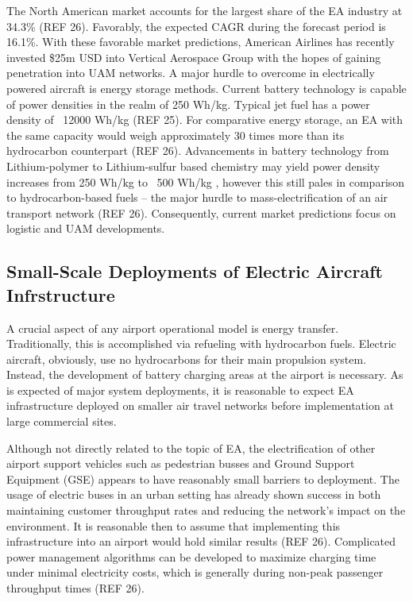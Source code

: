 \documentclass{article}
\begin{document}
The North American market accounts for the largest share of the EA industry at 34.3\% (REF 26). 
Favorably, the expected CAGR during the forecast period is 16.1\%. 
With these favorable market predictions, American Airlines has recently invested \$25m USD into Vertical Aerospace Group with the hopes of gaining penetration into UAM networks.  
A major hurdle to overcome in electrically powered aircraft is energy storage methods. 
Current battery technology is capable of power densities in the realm of 250  Wh/kg. 
Typical jet fuel has a power density of ~12000 Wh/kg (REF 25). 
For comparative energy storage, an EA with the same capacity would weigh approximately 30 times more than its hydrocarbon counterpart (REF 26).  
Advancements in battery technology from Lithium-polymer to Lithium-sulfur based chemistry may yield power density increases from 250 Wh/kg to ~500 Wh/kg , however this still pales in comparison to hydrocarbon-based fuels – the major hurdle to mass-electrification of an air transport network (REF 26). 
Consequently, current market predictions focus on logistic and UAM developments.\par


\subsection{Small-Scale Deployments of Electric Aircraft Infrstructure}
A crucial aspect of any airport operational model is energy transfer. 
Traditionally, this is accomplished via refueling with hydrocarbon fuels. 
Electric aircraft, obviously, use no hydrocarbons for their main propulsion system. 
Instead, the development of battery charging areas at the airport is necessary. 
As is expected of major system deployments, it is reasonable to expect EA infrastructure deployed on smaller air travel networks before implementation at large commercial sites.\par


Although not directly related to the topic of EA, the electrification of other airport support vehicles such as pedestrian busses and Ground Support Equipment (GSE) appears to have reasonably small barriers to deployment. 
The usage of electric buses in an urban setting has already shown success in both maintaining customer throughput rates and reducing the network’s impact on the environment.  
It is reasonable then to assume that implementing this infrastructure into an airport would hold similar results (REF 26). 
Complicated power management algorithms can be developed to maximize charging time under minimal electricity costs, which is generally during non-peak passenger throughput times (REF 26).\par
\end{document}
